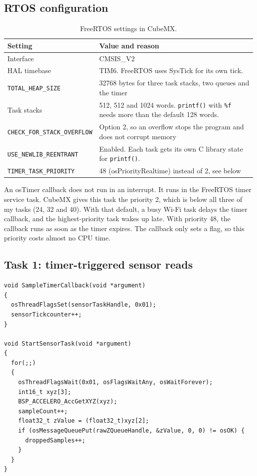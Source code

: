 \documentclass[11pt,a4paper]{article}
\begin{document}
\subsection{RTOS configuration}

\begin{table}[h]
\centering
\caption{FreeRTOS settings in CubeMX.}
\begin{tabular}{@{}lp{9.5cm}@{}}
\toprule
Setting & Value and reason \\
\midrule
Interface              & CMSIS\_V2 \\
HAL timebase           & TIM6. FreeRTOS uses SysTick for its own tick. \\
\texttt{TOTAL\_HEAP\_SIZE} & 32768 bytes for three task stacks, two queues and the timer \\
Task stacks            & 512, 512 and 1024 words. \texttt{printf()} with \texttt{\%f} needs more than the default 128 words. \\
\texttt{CHECK\_FOR\_STACK\_OVERFLOW} & Option 2, so an overflow stops the program and does not corrupt memory \\
\texttt{USE\_NEWLIB\_REENTRANT} & Enabled. Each task gets its own C library state for \texttt{printf()}. \\
\texttt{TIMER\_TASK\_PRIORITY} & 48 (osPriorityRealtime) instead of 2, see below \\
\bottomrule
\end{tabular}
\end{table}

An osTimer callback does not run in an interrupt. It runs in the FreeRTOS
timer service task. CubeMX gives this task the priority 2, which is below all
three of my tasks (24, 32 and 40). With that default, a busy Wi-Fi task delays
the timer callback, and the highest-priority task wakes up late. With
priority 48, the callback runs as soon as the timer expires. The callback only
sets a flag, so this priority costs almost no CPU time.

\subsection{Task 1: timer-triggered sensor reads}

\begin{lstlisting}[caption={Timer callback and sensor task (\texttt{rtos/Core/Src/main.c}, comments shortened).}]
void SampleTimerCallback(void *argument)
{
  osThreadFlagsSet(sensorTaskHandle, 0x01);
  sensorTickcounter++;
}

void StartSensorTask(void *argument)
{
  for(;;)
  {
    osThreadFlagsWait(0x01, osFlagsWaitAny, osWaitForever);
    int16_t xyz[3];
    BSP_ACCELERO_AccGetXYZ(xyz);
    sampleCount++;
    float32_t zValue = (float32_t)xyz[2];
    if (osMessageQueuePut(rawZQueueHandle, &zValue, 0, 0) != osOK) {
      droppedSamples++;
    }
  }
}
\end{lstlisting}
\end{document}
